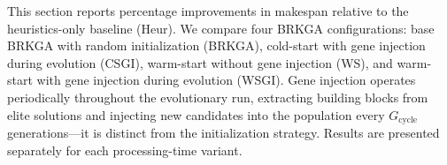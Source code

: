 \documentclass[sigconf]{acmart}
\begin{document}
This section reports percentage improvements in makespan relative to the heuristics-only baseline (Heur). We compare four BRKGA configurations: base BRKGA with random initialization (BRKGA), cold-start with gene injection during evolution (CSGI), warm-start without gene injection (WS), and warm-start with gene injection during evolution (WSGI). Gene injection operates periodically throughout the evolutionary run, extracting building blocks from elite solutions and injecting new candidates into the population every $G_{\text{cycle}}$ generations---it is distinct from the initialization strategy. Results are presented separately for each processing-time variant.






\end{document}
